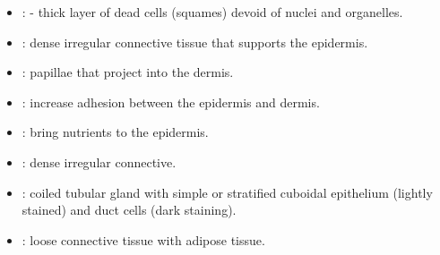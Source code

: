 \begin{multicols}{2}
\begin{itemize}
  \item {}: - thick layer of dead cells (squames) devoid of nuclei and organelles.
  
  \begin{center}
  \end{center}
  
  \item {}:  dense irregular connective tissue that supports the epidermis. 
  
  \begin{center}
  \end{center}
  
  \item {}: papillae that project into the dermis. 
  
  \begin{center}
  \end{center}
  
  \item {}:  increase adhesion between the epidermis and dermis.
  
  \begin{center}
  \end{center}
  
  \item {}: bring nutrients to the epidermis.
  
  \begin{center}
  \end{center}
  
  \item {}: dense irregular connective. 
  
  \begin{center}
  \end{center}
  
  \item {}: coiled tubular gland with simple or stratified cuboidal epithelium (lightly stained) and duct cells (dark staining).
  
  \begin{center}
  \end{center}
  
  \item {}: loose connective tissue with adipose tissue.
  
  \begin{center}
  \end{center}
\end{itemize}
\end{multicols}

